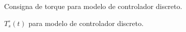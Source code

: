 \documentclass[a4paper, 10pt, onecolumn,journal]{ieeeconf}
\begin{document}
\begin{figure}[H]
	\centering
	\begin{adjustbox}{scale=0.5,max width=\columnwidth}
	\end{adjustbox}
	\caption{Consigna de torque para modelo de controlador discreto.}
	\label{Consigna de torque para modelo de controlador discreto}
\end{figure}
\begin{figure}[H]
	\centering
	\begin{adjustbox}{scale=0.5,max width=\columnwidth}
	\end{adjustbox}
	\caption{${T^{\circ}_s}(t)$ para modelo de controlador discreto.}
	\label{Ts para modelo de controlador discreto}
\end{figure}
\end{document}
